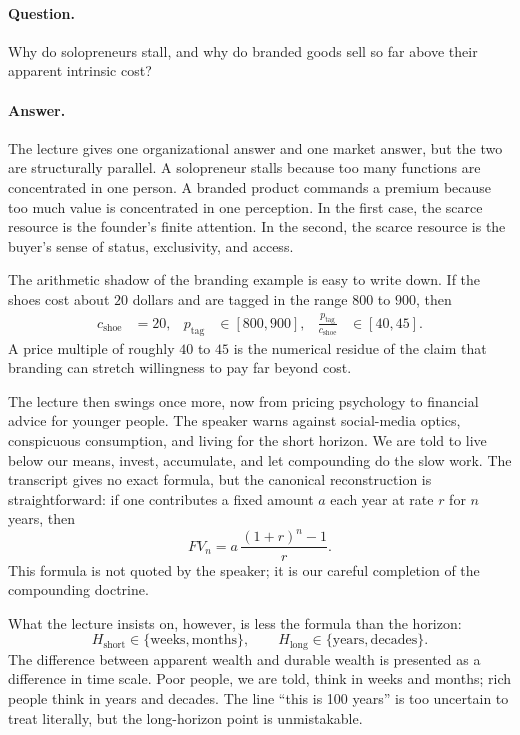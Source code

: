 \paragraph{Question.}
Why do solopreneurs stall, and why do branded goods sell so far above their apparent intrinsic cost?

\paragraph{Answer.}
The lecture gives one organizational answer and one market answer, but the two are structurally parallel. A solopreneur stalls because too many functions are concentrated in one person. A branded product commands a premium because too much value is concentrated in one perception. In the first case, the scarce resource is the founder's finite attention. In the second, the scarce resource is the buyer's sense of status, exclusivity, and access.

The arithmetic shadow of the branding example is easy to write down. If the shoes cost about \(20\) dollars and are tagged in the range \(800\) to \(900\), then
\begin{align}
c_{\text{shoe}} &= 20, &
p_{\text{tag}} &\in [800,900], &
\frac{p_{\text{tag}}}{c_{\text{shoe}}} &\in [40,45].
\end{align}
A price multiple of roughly \(40\) to \(45\) is the numerical residue of the claim that branding can stretch willingness to pay far beyond cost.

The lecture then swings once more, now from pricing psychology to financial advice for younger people. The speaker warns against social-media optics, conspicuous consumption, and living for the short horizon. We are told to live below our means, invest, accumulate, and let compounding do the slow work. The transcript gives no exact formula, but the canonical reconstruction is straightforward: if one contributes a fixed amount \(a\) each year at rate \(r\) for \(n\) years, then
\begin{equation}
FV_n = a\,\frac{(1+r)^n-1}{r}.
\end{equation}
This formula is not quoted by the speaker; it is our careful completion of the compounding doctrine.

What the lecture insists on, however, is less the formula than the horizon:
\begin{equation}
H_{\text{short}}\in\{\text{weeks},\text{months}\},
\qquad
H_{\text{long}}\in\{\text{years},\text{decades}\}.
\end{equation}
The difference between apparent wealth and durable wealth is presented as a difference in time scale. Poor people, we are told, think in weeks and months; rich people think in years and decades. The line ``this is 100 years'' is too uncertain to treat literally, but the long-horizon point is unmistakable.


